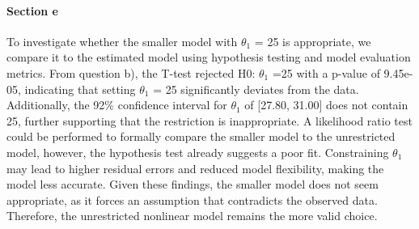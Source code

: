 \documentclass[
  11pt,
]{article}
\begin{document}
\paragraph{Section e}\label{section-e-1}

To investigate whether the smaller model with \(\theta_1\) = 25 is
appropriate, we compare it to the estimated model using hypothesis
testing and model evaluation metrics. From question b), the T-test
rejected H0: \(\theta_1\) =25 with a p-value of 9.45e-05, indicating
that setting \(\theta_1\) = 25 significantly deviates from the data.
Additionally, the 92\% confidence interval for \(\theta_1\) of {[}27.80,
31.00{]} does not contain 25, further supporting that the restriction is
inappropriate. A likelihood ratio test could be performed to formally
compare the smaller model to the unrestricted model, however, the
hypothesis test already suggests a poor fit. Constraining \(\theta_1\)
may lead to higher residual errors and reduced model flexibility, making
the model less accurate. Given these findings, the smaller model does
not seem appropriate, as it forces an assumption that contradicts the
observed data. Therefore, the unrestricted nonlinear model remains the
more valid choice.
\end{document}
